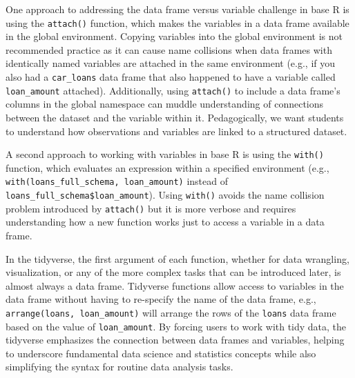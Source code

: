 \documentclass[12pt]{article}
\begin{document}
One approach to addressing the data frame versus variable challenge in
base R is using the \texttt{attach()} function, which makes the
variables in a data frame available in the global environment. Copying
variables into the global environment is not recommended practice
\citep{google-style} as it can cause name collisions when data frames
with identically named variables are attached in the same environment
(e.g., if you also had a \texttt{car\_loans} data frame that also
happened to have a variable called \texttt{loan\_amount} attached).
Additionally, using \texttt{attach()} to include a data frame's columns
in the global namespace can muddle understanding of connections between
the dataset and the variable within it. Pedagogically, we want students
to understand how observations and variables are linked to a structured
dataset.

A second approach to working with variables in base R is using the
\texttt{with()} function, which evaluates an expression within a
specified environment (e.g.,
\texttt{with(loans\_full\_schema,\ loan\_amount)} instead of
\texttt{loans\_full\_schema\$loan\_amount}). Using \texttt{with()}
avoids the name collision problem introduced by \texttt{attach()} but it
is more verbose and requires understanding how a new function works just
to access a variable in a data frame.

In the tidyverse, the first argument of each function, whether for data
wrangling, visualization, or any of the more complex tasks that can be
introduced later, is almost always a data frame. Tidyverse functions
allow access to variables in the data frame without having to re-specify
the name of the data frame, e.g., \texttt{arrange(loans,\ loan\_amount)}
will arrange the rows of the \texttt{loans} data frame based on the
value of \texttt{loan\_amount}. By forcing users to work with tidy data,
the tidyverse emphasizes the connection between data frames and
variables, helping to underscore fundamental data science and statistics
concepts while also simplifying the syntax for routine data analysis
tasks.
\end{document}

